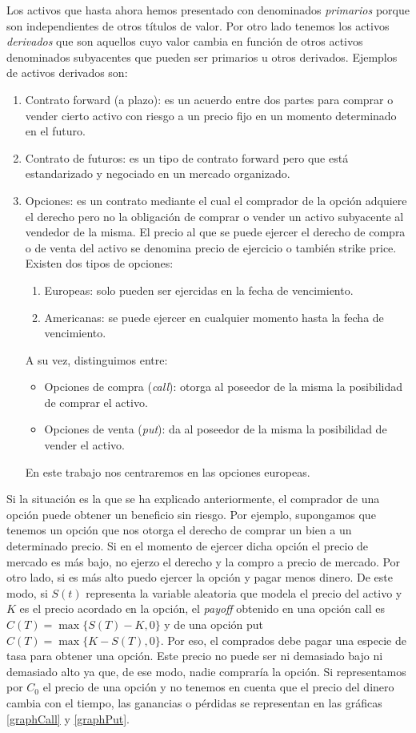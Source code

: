 Los activos que hasta ahora hemos presentado con denominados \textit{primarios} porque son independientes de otros títulos de valor. Por otro lado tenemos los activos \textit{derivados} que son aquellos cuyo valor cambia en función de otros activos denominados subyacentes que pueden ser primarios u otros derivados. Ejemplos de activos derivados son:
\begin{enumerate}
\item Contrato forward (a plazo): es un acuerdo entre dos partes para comprar o vender cierto activo con riesgo a un precio fijo en un momento determinado en el futuro. 
\item Contrato de futuros: es un tipo de contrato forward pero que está estandarizado y negociado en un mercado organizado.
\item Opciones: es un contrato mediante el cual el comprador de la opción adquiere el derecho pero no la obligación de comprar o vender un activo subyacente al vendedor de la misma. El precio al que se puede ejercer el derecho de compra o de venta del activo se denomina precio de ejercicio o también strike price. Existen dos tipos de opciones: 
\begin{enumerate}
	\item Europeas: solo pueden ser ejercidas en la fecha de vencimiento.
	\item Americanas:  se puede ejercer en cualquier momento hasta la fecha de vencimiento.
\end{enumerate}
A su vez, distinguimos entre:
\begin{itemize}
	\item Opciones de compra (\textit{call}): otorga al poseedor de la misma la posibilidad de comprar el activo.
	\item Opciones de venta (\textit{put}): da al poseedor de la misma la posibilidad de vender el activo.
\end{itemize}

En este trabajo nos centraremos en las opciones europeas. 
\end{enumerate} 

Si la situación es la que se ha explicado anteriormente, el comprador de una opción puede obtener un beneficio sin riesgo. Por ejemplo, supongamos que tenemos un opción que nos otorga el derecho de comprar un bien a un determinado precio. Si en el momento de ejercer dicha opción el precio de mercado es más bajo, no ejerzo el derecho y la compro a precio de mercado. Por otro lado, si es más alto puedo ejercer la opción y pagar menos dinero. De este modo, si $ S(t) $ representa la variable aleatoria que modela el precio del activo y $ K $ es el precio acordado en la opción, el \textit{payoff} obtenido en una opción call es $ C(T) = \max\{S(T)-K, 0\} $ y de una opción put $ C(T) = \max\{K-S(T), 0\}  $. Por eso, el comprados debe pagar una especie de tasa para obtener una opción. Este precio no puede ser ni demasiado bajo ni demasiado alto ya que, de ese modo, nadie compraría la opción. Si representamos por $ C_0 $ el precio de una opción y no tenemos en cuenta que el precio del dinero cambia con el tiempo, las ganancias o pérdidas se representan en las gráficas \ref{graphCall} y \ref{graphPut}. \\


